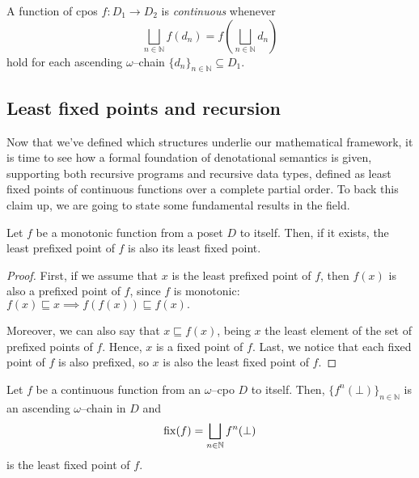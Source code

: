 \begin{dfn}
  A function of cpos \(f \colon D_1 \to D_2\) is \emph{continuous} whenever
  \begin{equation*}
    \bigsqcup_{n \in \mathbb{N}} f(d_n) = f\left(\bigsqcup_{n\in\mathbb{N}}d_n\right)
  \end{equation*}
  hold for each ascending \(\omega\)--chain \(\lbrace d_n \rbrace_{n \in \mathbb{N}} \subseteq D_1\). %
\end{dfn}

\subsection[Fixed points]{Least fixed points and recursion}

Now that we've defined which structures underlie our mathematical framework, it is time to see how a formal foundation of denotational semantics is given, supporting both recursive programs and recursive data types, defined as least
fixed points of continuous functions over a complete partial order.
To back this claim up, we are going to state some fundamental results in the field.

\begin{lem}\label{lem:cpo-prefixed}
  Let \(f\) be a monotonic function from a poset \(D\) to itself.
  Then, if it exists, the least prefixed point of \(f\) is also its least fixed point.
\end{lem}
\begin{proof}
  First, if we assume that \(x\) is the least prefixed point of \(f\), then \(f(x)\) is also a prefixed point of \(f\), since \(f\) is monotonic:
  \(
    f(x) \sqsubseteq x \implies f(f(x)) \sqsubseteq f(x).
  \)

  Moreover, we can also say that \(x \sqsubseteq f(x)\), being \(x\) the least element of the set of prefixed points of \(f\).
  Hence, \(x\) is a fixed point of \(f\).
  Last, we notice that each fixed point of \(f\) is also prefixed, so \(x\) is also the least fixed point of \(f\).\qedhere
\end{proof}

\begin{thm}\label{thm:cpo-fixed}
  Let \(f\) be a continuous function from an \(\omega\)--cpo \(D\) to itself. %
  Then, \(\lbrace f^n(\bot) \rbrace_{n \in \mathbb{N}}\) is an ascending \(\omega\)--chain in \(D\) and %
  \begin{equation}
    \operatorname{fix}(f) = \bigsqcup_{n \in \mathbb{N}} f^n(\bot)
  \end{equation}
  is the least fixed point of \(f\).
\end{thm}

